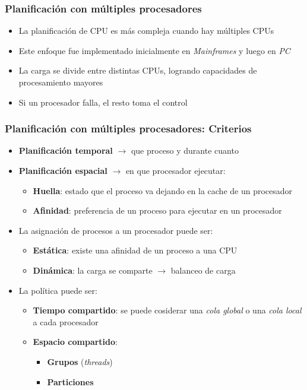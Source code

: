 \begin{frame}
  \frametitle{Planificación con múltiples procesadores}
	\begin{itemize}
		\item La planificación de CPU es más compleja cuando hay múltiples CPUs	
		\item Este enfoque fue implementado inicialmente en \textit{Mainframes} y luego en \textit{PC}
		\item La carga se divide entre distintas CPUs, logrando capacidades de procesamiento mayores
		\item Si un procesador falla, el resto toma el control
	\end{itemize}
\end{frame}

\begin{frame}
  \frametitle{Planificación con múltiples procesadores: \textbf{Criterios}}
	\begin{itemize}
		\item \textbf{Planificación temporal} $\rightarrow$ que proceso y durante cuanto
		\item \textbf{Planificación espacial} $\rightarrow$ en que procesador ejecutar:		
		\begin{itemize}
			\item \textbf{Huella}: estado que el proceso va dejando en la cache de un procesador
			\item \textbf{Afinidad}: preferencia de un proceso para ejecutar en un procesador 
		\end{itemize}
		\item La asignación de procesos a un procesador puede ser:
		\begin{itemize}
			\item \textbf{Estática}: existe una afinidad de un proceso a una CPU
			\item \textbf{Dinámica}: la carga se comparte $\rightarrow$ balanceo de carga
		\end{itemize}
		\item La política puede ser:
		\begin{itemize}
			\item \textbf{Tiempo compartido}: se puede cosiderar una \emph{cola global} o una \emph{cola local} a cada procesador
			\item \textbf{Espacio compartido}:
			\begin{itemize}
				\item \textbf{Grupos} (\emph{threads})
				\item \textbf{Particiones}
			\end{itemize}
		\end{itemize}		
	\end{itemize}
\end{frame}

